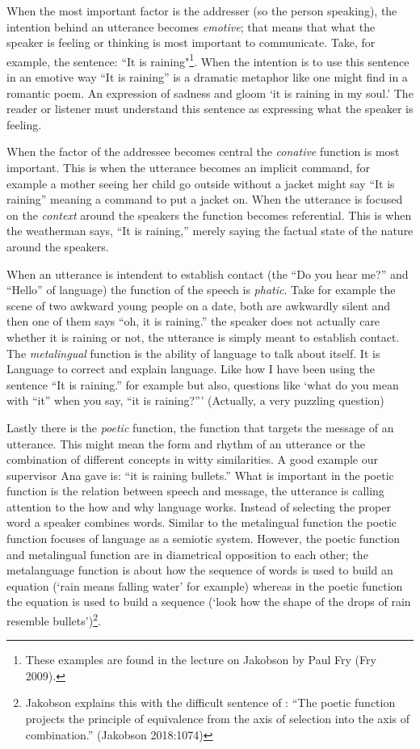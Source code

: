 \vspace{0.3cm}


When the most important factor is the addresser (so the person speaking), the intention behind an utterance becomes \textit{emotive}; that means that what the speaker is feeling or thinking is most important to communicate. Take, for example, the sentence: “It is raining"\footnote{These examples are found in the lecture on Jakobson by Paul Fry (Fry 2009).}. When the intention is to use this sentence in an emotive way “It is raining” is a dramatic metaphor like one might find in a romantic poem. An expression of sadness and gloom ‘it is raining in my soul.’ The reader or listener must understand this sentence as expressing what the speaker is feeling. 						

When the factor of the addressee becomes central the \textit{conative} function is most important. This is when the utterance becomes an implicit command, for example a mother seeing her child go outside without a jacket might say “It is raining” meaning a command to put a jacket on. 				
When the utterance is focused on the \textit{context} around the speakers the function becomes referential. This is when the weatherman says, “It is raining,” merely saying the factual state of the nature around the speakers. 				

When an utterance is intendent to establish contact (the “Do you hear me?” and “Hello” of language) the function of the speech is \textit{phatic}. Take for example the scene of two awkward young people on a date, both are awkwardly silent and then one of them says “oh, it is raining.” the speaker does not actually care whether it is raining or not, the utterance is simply meant to establish contact. 						
The \textit{metalingual} function is the ability of language to talk about itself. It is Language to correct and explain language. Like how I have been using the sentence “It is raining.” for example but also, questions like ‘what do you mean with “it” when you say, “it is raining?”’ (Actually, a very puzzling question) 							

Lastly there is the \textit{poetic} function, the function that targets the message of an utterance. This might mean the form and rhythm of an utterance or the combination of different concepts in witty similarities. A good example our supervisor Ana gave is: “it is raining bullets.” What is important in the poetic function is the relation between speech and message, the utterance is calling attention to the how and why language works. Instead of selecting the proper word a speaker combines words. Similar to the metalingual function the poetic function focuses of language as a semiotic system. However, the poetic function and metalingual function are in diametrical opposition to each other; the metalanguage function is about how the sequence of words is used to build an equation (‘rain means falling water’ for example) whereas in the poetic function the equation is used to build a sequence (‘look how the shape of the drops of rain resemble bullets’)\footnote{Jakobson explains this with the difficult sentence of : “The poetic function projects the principle of equivalence from the axis of selection into the axis of combination.” (Jakobson 2018:1074)}.

